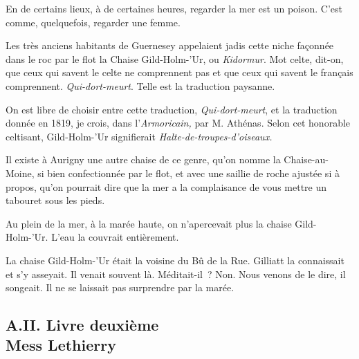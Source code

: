 \documentclass[french,twoside]{book} %
\begin{document}
En de certains lieux, à de certaines heures, regarder la mer est un poison. C’est comme, quelquefois, regarder une femme.\par
Les très anciens habitants de Guernesey appelaient jadis cette niche façonnée dans le roc par le flot la Chaise Gild-Holm-’Ur, ou \emph{Kidormur}. Mot celte, dit-on, que ceux qui savent le celte ne comprennent pas et que ceux qui savent le français comprennent. \emph{Qui-dort-meurt}. Telle est la traduction paysanne.\par
 On est libre de choisir entre cette traduction, \emph{Qui-dort-meurt}, et la traduction donnée en 1819, je crois, dans l’\emph{Armoricain,} par M. Athénas. Selon cet honorable celtisant, Gild-Holm-’Ur signifierait \emph{Halte-de-troupes-d’oiseaux.}\par
Il existe à Aurigny une autre chaise de ce genre, qu’on nomme la Chaise-au-Moine, si bien confectionnée par le flot, et avec une saillie de roche ajustée si à propos, qu’on pourrait dire que la mer a la complaisance de vous mettre un tabouret sous les pieds.\par
Au plein de la mer, à la marée haute, on n’apercevait plus la chaise Gild-Holm-’Ur. L’eau la couvrait entièrement.\par
La chaise Gild-Holm-’Ur était la voisine du Bû de la Rue. Gilliatt la connaissait et s’y asseyait. Il venait souvent là. Méditait-il ? Non. Nous venons de le dire, il songeait. Il ne se laissait pas surprendre par la marée.\par
  \subsection[{A.II. Livre deuxième. Mess Lethierry}]{A.II. Livre deuxième \\
Mess Lethierry}
\end{document}

